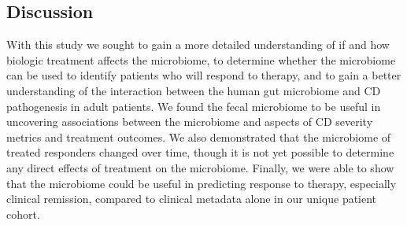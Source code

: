 \documentclass[11pt,]{article}
\begin{document}
\subsection{Discussion}\label{discussion}

With this study we sought to gain a more detailed understanding of if
and how biologic treatment affects the microbiome, to determine whether
the microbiome can be used to identify patients who will respond to
therapy, and to gain a better understanding of the interaction between
the human gut microbiome and CD pathogenesis in adult patients. We found
the fecal microbiome to be useful in uncovering associations between the
microbiome and aspects of CD severity metrics and treatment outcomes. We
also demonstrated that the microbiome of treated responders changed over
time, though it is not yet possible to determine any direct effects of
treatment on the microbiome. Finally, we were able to show that the
microbiome could be useful in predicting response to therapy, especially
clinical remission, compared to clinical metadata alone in our unique
patient cohort.
\end{document}
